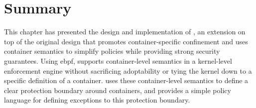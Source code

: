 \section{Summary}%
\label{s:bpfcontain-summary}

This chapter has presented the design and implementation of \bpfcontain{}, an extension on
top of the original \bpfbox{} design that promotes container-specific confinement and uses
container semantics to simplify policies while providing strong security guarantees.
Using \gls{ebpf}, \bpfcontain{} supports container-level semantics in a kernel-level
enforcement engine without sacrificing adoptability or tying the kernel down to a specific
definition of a container. \bpfcontain{} uses these container-level semantics to define
a clear protection boundary around containers, and provides a simple policy language for
defining exceptions to this protection boundary.
